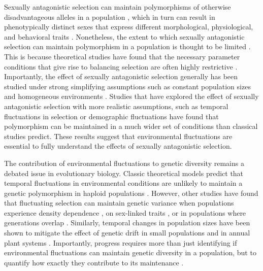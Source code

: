 \documentclass[12pt]{article}
\begin{document}
Sexually antagonistic selection can maintain polymorphisms of otherwise disadvantageous alleles in a population \citep{gavrilets2014sexual}, which in turn can result in phenotypically distinct sexes that express different morphological, physiological, and behavioral traits \citep{mori2017sexual,connallon2018environmental}. Nonetheless,
the extent to which sexually antagonistic selection can maintain polymorphism in a population is thought to be limited \citep{connallon2012general}. This is because theoretical studies have found that the necessary parameter conditions that give rise to balancing selection are often highly restrictive \citep{kidwell1977regions,pamilo1979genic,hedrick1999antagonistic,curtsinger1994antagonistic, patten2010fitness, jordan2012potential}. Importantly, the effect of sexually antagonistic selection generally has been studied under strong simplifying assumptions such as constant population sizes and homogeneous environments  \citep{kidwell1977regions, pamilo1979genic, immler2012ploidally, jordan2012potential}. Studies that have explored the effect of sexually antagonistic selection with more realistic assumptions, such as temporal fluctuations in selection \citep{connallon_evolutionary_2018} or demographic fluctuations \citep{connallon2012general} have found that polymorphism can be maintained in a much wider set of conditions than classical studies predict. These results suggest that environmental fluctuations are essential to fully understand the effects of sexually antagonistic selection.

The contribution of environmental fluctuations to genetic diversity remains a debated issue in evolutionary biology. Classic theoretical models predict that temporal fluctuations in environmental conditions are unlikely to maintain a genetic polymorphism in haploid populations \citep{dempster1955maintenance,hedrick1974genetic,hedrick1986genetic}. However, other studies have found that fluctuating selection can maintain genetic variance when populations experience density dependence \citep{dean2005protecting}, on sex-linked traits \citep{reinhold2000maintenance}, or in populations where generations overlap \citep{ellner1994role, ellner1996patterns}. Similarly, temporal changes in population sizes have been shown to mitigate the effect of genetic drift in small populations \citep{pemberton1996maintenance} and in annual plant systems \citep{nunney2002effective}. Importantly, progress requires more than just identifying if environmental fluctuations can maintain genetic diversity in a population, but to quantify how exactly they contribute to its maintenance \citep{ellner2016quantify}.
\end{document}
